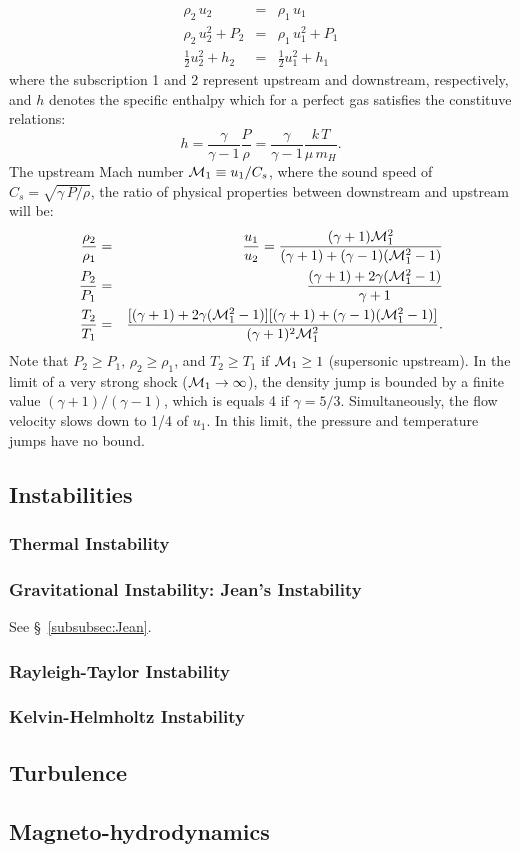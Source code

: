 \begin{eqnarray}
    \rho_{2}\,u_{2} &=& \rho_{1}\,u_{1}    \\
    \rho_{2}\,u_{2}^{2} + P_{2} &=& \rho_{1}\,u_{1}^{2} + P_{1}    \\
    \frac{1}{2}u_{2}^{2} + h_{2} &=& \frac{1}{2}u_{1}^{2} + h_{1}
\end{eqnarray}
where the subscription 1 and 2 represent upstream and downstream, respectively, and 
$h$ denotes the specific enthalpy which for a perfect gas satisfies the constituve relations:
\begin{equation}
    h=\frac{\gamma}{\gamma-1}\frac{P}{\rho} = \frac{\gamma}{\gamma-1}\frac{k\,T}{\mu\,m_{H}}.
\end{equation}
The upstream Mach number ${\mathcal M}_{1} \equiv u_{1}/C_{s}$, where the sound speed of 
$C_{s} = \sqrt{\gamma\,P/\rho}$, the ratio of physical properties between downstream and upstream will be:
\begin{eqnarray}
    \frac{\rho_{2}}{\rho_{1}} &=& \frac{u_{1}}{u_{2}} = \frac{(\gamma+1){\mathcal M}_{1}^{2}}{(\gamma+1) + (\gamma-1)({\mathcal M}_{1}^{2}-1)} \\
    \frac{P_{2}}{P_{1}} &=& \frac{(\gamma+1) + 2\gamma({\mathcal M}_{1}^{2}-1)}{\gamma+1} \\
    \frac{T_{2}}{T_{1}} &=& \frac{[ (\gamma+1) + 2\gamma({\mathcal M}_{1}^{2}-1)] [(\gamma+1) + (\gamma-1)({\mathcal M}_{1}^{2}-1)]}{(\gamma+1)^{2}{\mathcal M}_{1}^{2}}.
\end{eqnarray}
Note that $P_{2} \geq P_{1},\, \rho_{2} \geq \rho_{1}$, and $T_{2}\geq T_{1}$ if ${\mathcal M}_{1} \geq 1$ (supersonic upstream). In the limit of a very strong shock (${\mathcal M}_{1}\rightarrow \infty$),
the density jump is bounded by a finite value $(\gamma+1)/(\gamma-1)$, which is equals 4 if $\gamma=5/3$.
Simultaneously, the flow velocity slows down to 1/4 of $u_{1}$. In this limit, the pressure
and temperature jumps have no bound. 


\bigskip
\subsection{Instabilities}
\subsubsection{Thermal Instability}
\subsubsection{Gravitational Instability: Jean's Instability}
See \S~\ref{subsubsec:Jean}.
\subsubsection{Rayleigh-Taylor Instability}
\subsubsection{Kelvin-Helmholtz Instability}

\bigskip
\subsection{Turbulence}

\bigskip
\subsection{Magneto-hydrodynamics}
%
%
